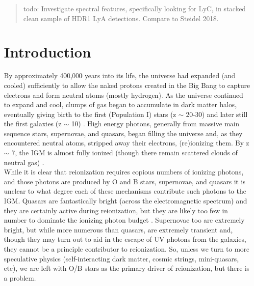 \documentclass{aastex62}
\begin{document}

\author[0000-0002-8925-9769]{Dustin Davis}


\begin{abstract}

{ \color{red} todo: Investigate spectral features, specifically looking for LyC, in stacked clean sample of HDR1 LyA detections. Compare to Steidel 2018.}

\end{abstract}




\section{Introduction} \label{sec:intro}

By approximately 400,000 years into its life, the universe had expanded (and cooled) sufficiently to allow the naked protons created in the Big Bang to capture electrons and form neutral atoms (mostly hydrogen). As the universe continued to expand and cool, clumps of gas began to accumulate in dark matter halos, eventually giving birth to the first (Population I) stars (z $\sim$ 20-30) and later still the first galaxies (z $\sim$ 10) \cite{Bromm}. High energy photons, generally from massive main sequence stars, supernovae, and quasars, began filling the universe and, as they encountered neutral atoms, stripped away their electrons, (re)ionizing them. By z $\sim$ 7, the IGM is almost fully ionized (though there remain scattered clouds of neutral gas) \cite{Stark}.\\

While it is clear that reionization requires copious numbers of ionizing photons, and those photons are produced by O and B stars, supernovae, and quasars it is unclear to what degree each of these mechanisms contribute such photons to the IGM. Quasars are fantastically bright (across the electromagnetic spectrum) and they are certainly active during reionization, but they are likely too few in number to dominate the ionizing photon budget \cite{Bromm}. Supernovae too are extremely bright, but while more numerous than quasars, are extremely transient and, though they may turn out to aid in the escape of UV photons from the galaxies, they cannot be a principle contributor to reionization. So, unless we turn to more speculative physics (self-interacting dark matter, cosmic strings, mini-quasars, etc), we are left with O/B stars as the primary driver of reionization, but there is a problem.\\
\end{document}
